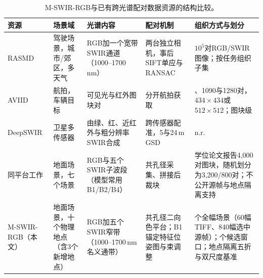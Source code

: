 \documentclass[UTF8,a4paper,10pt]{ctexart}
\begin{document}
\begin{table}[htbp]
\centering
\caption{M-SWIR-RGB与已有跨光谱配对数据资源的结构比较。}
\label{tab:related-zh}
\vspace{1pt}{\footnotesize\noindent 已有资源信息摘自对应文献；``n.r.''表示原文未报告。\par}
\small
\begin{tabularx}{\textwidth}{@{}>{\raggedright\arraybackslash}p{}>{\raggedright\arraybackslash}p{}>{\raggedright\arraybackslash}p{}>{\raggedright\arraybackslash}p{}>{\raggedright\arraybackslash}X@{}}
\toprule
资源 & 场景域 & 光谱内容 & 配对机制 & 组织方式与划分\\
\midrule
RASMD \cite{jin2026} & 驾驶场景，城市/郊区，多天气 & RGB加一个宽带SWIR通道（1000--1700\,nm） & 两台独立相机，事后SIFT单应与RANSAC & $10^5$对RGB/SWIR图像；按任务组织子集\\
AVIID \cite{aviid2023} & 航拍，车辆目标 & 可见光与红外图块对 & 分开航拍获取 & 993、1090与1280对，$434\times434$或$512\times512$；图块级\\
DeepSWIR \cite{rout2019} & 卫星多传感器 & 由绿、红、近红外与粗分辨率SWIR合成 & 跨传感器配准，5与24\,m GSD & n.r.\\
同平台工作\cite{chen2026thesis,chen2026threeband} & 地面场景，七个场景 & RGB与五个SWIR子波段（模型常用B1/B2/B4） & 共孔径采集、拼接后裁块 & 学位论文报告4{,}000对图块，随机划分为3{,}200/800对；不公开源帧与地点隔离支持\\
M-SWIR-RGB（本文） & 地面场景，十个物理地点（含3个新增地点） & RGB加五个SWIR窄带（1000--1700\,nm名义通带） & 共孔径二向色平台；B1锚定特征位姿图与束调整 & \DatasetSceneCount{}个全幅场景（60幅TIFF、840幅选中源帧）；\QualifiedWindowCount{}个候选窗口；地点隔离五折与双尺度基准\\
\bottomrule
\end{tabularx}
\end{table}
\end{document}
